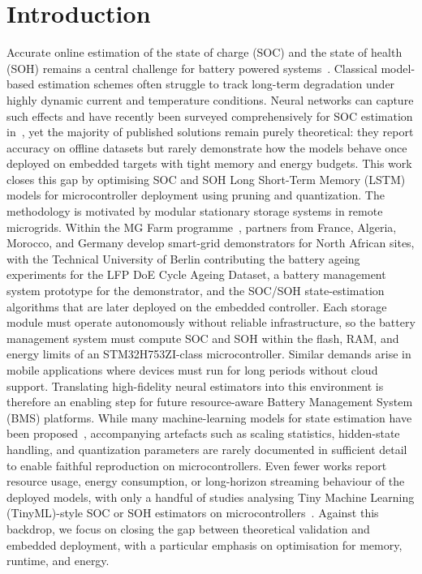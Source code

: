 \documentclass[final,3p,times]{elsarticle}
\begin{document}
\normalsize
\section{Introduction}
Accurate online estimation of the state of charge (SOC) and the state of health (SOH) remains a central challenge for battery powered systems~\cite{yaoSmarterBatteryManagement2025a,a.m.s.m.h.s.attanayakaEstimationStateCharge2019,berecibarCriticalReviewState2016,shrivastavaReviewTechnologicalAdvancement2023}. Classical model-based estimation schemes often struggle to track long-term degradation under highly dynamic current and temperature conditions. Neural networks can capture such effects and have recently been surveyed comprehensively for SOC estimation in~\cite{yaoSmarterBatteryManagement2025a}, yet the majority of published solutions remain purely theoretical: they report accuracy on offline datasets but rarely demonstrate how the models behave once deployed on embedded targets with tight memory and energy budgets. This work closes this gap by optimising SOC and SOH Long Short-Term Memory (LSTM) models for microcontroller deployment using pruning and quantization.
The methodology is motivated by modular stationary storage systems in remote microgrids. Within the MG Farm programme~\cite{leap-reMGFARMSmart,microenergyMGFARMPoweringSustainable,aqachtoulMGFARMIoTEdgeDriven2026,technischeuniversitatberlinMGFarmSmart}, partners from France, Algeria, Morocco, and Germany develop smart-grid demonstrators for North African sites, with the Technical University of Berlin contributing the battery ageing experiments for the LFP DoE Cycle Ageing Dataset, a battery management system prototype for the demonstrator, and the SOC/SOH state-estimation algorithms that are later deployed on the embedded controller. Each storage module must operate autonomously without reliable infrastructure, so the battery management system must compute SOC and SOH within the flash, RAM, and energy limits of an STM32H753ZI-class microcontroller. Similar demands arise in mobile applications where devices must run for long periods without cloud support. Translating high-fidelity neural estimators into this environment is therefore an enabling step for future resource-aware Battery Management System (BMS) platforms.
While many machine-learning models for state estimation have been proposed~\cite{yaoSmarterBatteryManagement2025a,rzepkaNeuralNetworkArchitecture2023a}, accompanying artefacts such as scaling statistics, hidden-state handling, and quantization parameters are rarely documented in sufficient detail to enable faithful reproduction on microcontrollers. Even fewer works report resource usage, energy consumption, or long-horizon streaming behaviour of the deployed models, with only a handful of studies analysing Tiny Machine Learning (TinyML)-style SOC or SOH estimators on microcontrollers~\cite{crocioniLiIonBatteriesParameter2020,Embedded_AI_only_SOC_mobile,Embedded_AI_SOH_badData}. Against this backdrop, we focus on closing the gap between theoretical validation and embedded deployment, with a particular emphasis on optimisation for memory, runtime, and energy.
\end{document}
